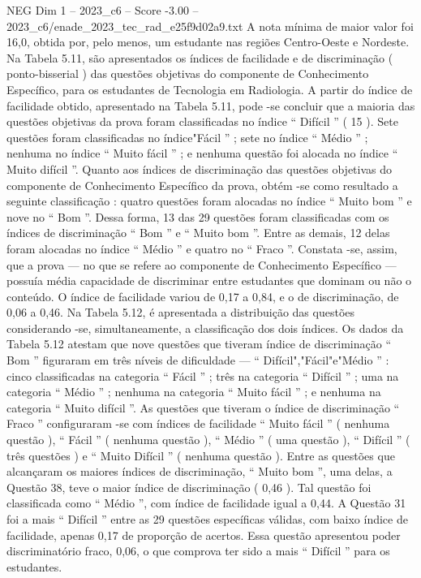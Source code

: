 \begin{textsample}{NEG Dim 1 – 2023\_c6 – Score -3.00 – 2023\_c6/enade\_2023\_tec\_rad\_e25f9d02a9.txt}
A nota mínima de maior valor foi 16,0, obtida por, pelo menos, um estudante nas regiões Centro-Oeste e Nordeste.
Na Tabela 5.11, são apresentados os índices de facilidade e de discriminação ( ponto-bisserial ) das questões objetivas do componente de Conhecimento Específico, para os estudantes de Tecnologia em Radiologia.
A partir do índice de facilidade obtido, apresentado na Tabela 5.11, pode -se concluir que a maioria das questões objetivas da prova foram classificadas no índice “ Difícil ” ( 15 ).
Sete questões foram classificadas no índice"Fácil ” ; sete no índice “ Médio ” ; nenhuma no índice “ Muito fácil ” ; e nenhuma questão foi alocada no índice “ Muito difícil ”.
Quanto aos índices de discriminação das questões objetivas do componente de Conhecimento Específico da prova, obtém -se como resultado a seguinte classificação : quatro questões foram alocadas no índice “ Muito bom ” e nove no “ Bom ”.
Dessa forma, 13 das 29 questões foram classificadas com os índices de discriminação “ Bom ” e “ Muito bom ”.
Entre as demais, 12 delas foram alocadas no índice “ Médio ” e quatro no “ Fraco ”.
Constata -se, assim, que a prova — no que se refere ao componente de Conhecimento Específico — possuía média capacidade de discriminar entre estudantes que dominam ou não o conteúdo.
O índice de facilidade variou de 0,17 a 0,84, e o de discriminação, de 0,06 a 0,46.
Na Tabela 5.12, é apresentada a distribuição das questões considerando -se, simultaneamente, a classificação dos dois índices.
Os dados da Tabela 5.12 atestam que nove questões que tiveram índice de discriminação “ Bom ” figuraram em três níveis de dificuldade — “ Difícil","Fácil"e"Médio ” : cinco classificadas na categoria “ Fácil ” ; três na categoria “ Difícil ” ; uma na categoria “ Médio ” ; nenhuma na categoria “ Muito fácil ” ; e nenhuma na categoria “ Muito difícil ”.
As questões que tiveram o índice de discriminação “ Fraco ” configuraram -se com índices de facilidade “ Muito fácil ” ( nenhuma questão ), “ Fácil ” ( nenhuma questão ), “ Médio ” ( uma questão ), “ Difícil ” ( três questões ) e “ Muito Difícil ” ( nenhuma questão ).
Entre as questões que alcançaram os maiores índices de discriminação, “ Muito bom ”, uma delas, a Questão 38, teve o maior índice de discriminação ( 0,46 ).
Tal questão foi classificada como “ Médio ”, com índice de facilidade igual a 0,44.
A Questão 31 foi a mais “ Difícil ” entre as 29 questões específicas válidas, com baixo índice de facilidade, apenas 0,17 de proporção de acertos.
Essa questão apresentou poder discriminatório fraco, 0,06, o que comprova ter sido a mais “ Difícil ” para os estudantes.

\end{textsample}
